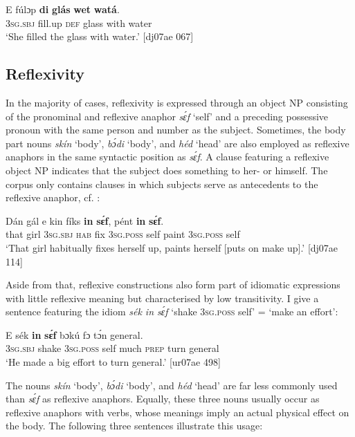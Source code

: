 \ea%
    \label{ex:key:1223}
    \gll E    fúlɔp  \textbf{di}  \textbf{glás}    \textbf{wet}    \textbf{watá}.\\
\textsc{3sg.sbj}  fill.up  \textsc{def}  glass  with    water   \\
\glt ‘She filled the glass with water.’ [dj07ae 067]
\z

\subsection{Reflexivity}\label{sec:9.3.5}

In the majority of cases, reflexivity is expressed through an object NP consisting of the pronominal and reflexive anaphor \textit{sɛ́f} ‘self’ and a preceding possessive pronoun with the same person and number as the subject{\fff}. Sometimes, the body part{\fff} nouns \textit{skín} ‘body’, \textit{bɔ́di} ‘body’, and \textit{héd} ‘head’ are also employed as reflexive anaphors in the same syntactic position as \textit{sɛ́f}. A clause featuring a reflexive object NP indicates that the subject does something to her- or himself. The corpus only contains clauses in which subjects serve as antecedents to the reflexive anaphor, cf. :


\ea%
    \label{ex:key:1224}
    \gll Dán    gál    e    kin  fíks  \textbf{in}    \textbf{sɛ́f},    pént    \textbf{in}    \textbf{sɛ́f}.\\
that    girl    \textsc{3sg.sbj}  \textsc{hab}  fix  \textsc{3sg.poss}  self    paint  \textsc{3sg.poss}  self\\

\glt ‘That girl habitually fixes herself up, paints herself [puts on make up].’ [dj07ae 114]
\z

Aside from that, reflexive constructions also form part of idiomatic expressions with little reflexive meaning but characterised by low transitivity. I give a sentence featuring the idiom \textit{sék in sɛ́f} ‘shake \textsc{3sg.poss} self’ = ‘make an effort’: 


\ea%
    \label{ex:key:1225}
    \gll E    sék    \textbf{in}    \textbf{sɛ́f}  bɔkú  fɔ  tɔ́n    general.\\
\textsc{3sg.sbj}  shake  \textsc{3sg.poss}  self  much  \textsc{prep}  turn    general\\

\glt ‘He made a big effort to turn general.’ [ur07ae 498]
\z

The nouns \textit{skín} ‘body’, \textit{bɔ́di} ‘body’, and \textit{héd} ‘head’ are far less commonly used than \textit{sɛ́f} as reflexive anaphors. Equally, these three nouns usually occur as reflexive anaphors with verbs, whose meanings imply an actual physical effect on the body. The following three sentences illustrate this usage: 


